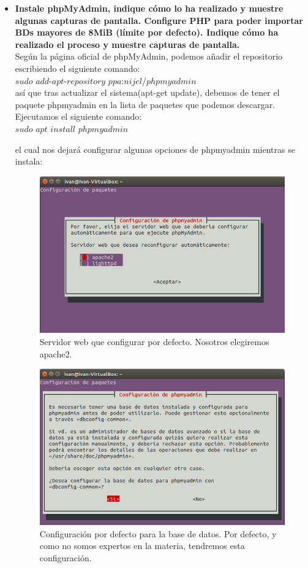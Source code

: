 \begin{itemize}
	\item \textbf{Instale phpMyAdmin, indique cómo lo ha realizado y muestre algunas capturas de pantalla. Configure PHP para poder importar BDs mayores de 8MiB (límite por defecto). Indique cómo ha realizado el proceso y muestre capturas de pantalla.}\\
	
	Según la página oficial de phpMyAdmin\cite{phpMyAdmin}, podemos añadir el repositorio escribiendo el siguiente comando:\\
	
	$sudo$ $add$-$apt$-$repository$ $ppa$:$nijel$/$phpmyadmin$\\
	
	así que tras actualizar el sistema(apt-get update), debemos de tener el paquete phpmyadmin en la lista de paquetes que podemos descargar. Ejecutamos el siguiente comando:\\
	
	$sudo$ $apt$ $install$ $phpmyadmin$
	
	el cual nos dejará configurar algunas opciones de phpmyadmin mientras se instala:\\
	
	\begin{figure}[H]
		\centering
		\includegraphics[width=0.7\linewidth]{phpMyAdminApache2}
		\caption[Phpmyadmin]{Servidor web que configurar por defecto. Nosotros elegiremos apache2.}
		\label{fig:phpMyAdminApache2}
	\end{figure}
	
	\begin{figure}[H]
		\centering
		\includegraphics[width=0.7\linewidth]{phpmyadminConfPorDefecto}
		\caption[Configuración por defecto.]{Configuración por defecto para la base de datos. Por defecto, y como no somos expertos en la materia, tendremos esta configuración.}
		\label{fig:phpmyadminConfPorDefecto}
	\end{figure}
	

\end{itemize}
